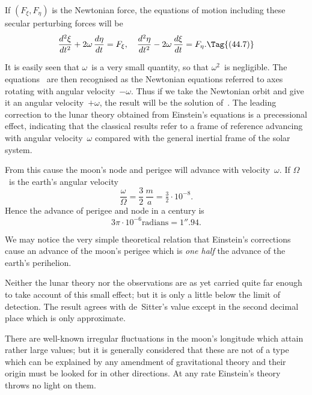 \documentclass[12pt]{book}
\begin{document}
If $(F_{\xi}, F_{\eta})$ is the Newtonian force, the equations of motion including these
secular perturbing forces will be
\[
\frac{d^{2}\xi}{dt^{2}} + 2\omega\, \frac{d\eta}{dt} = F_{\xi},\quad
\frac{d^{2}\eta}{dt^{2}} - 2\omega\, \frac{d\xi}{dt} = F_{\eta}.
\Tag{(44.7)}
\]

It is easily seen that $\omega$~is a very small quantity, so that $\omega^{2}$~is negligible.
The equations~ are then recognised as the Newtonian equations referred
to axes rotating with angular velocity~$-\omega$. Thus if we take the Newtonian
orbit and give it an angular velocity~$+\omega$, the result will be the solution of~.
The leading correction to the lunar theory obtained from Einstein's
equations is a precessional effect, indicating that the classical results refer to
a frame of reference advancing with angular velocity~$\omega$ compared with the
general inertial frame of the solar system.

From this cause the moon's node and perigee will advance with velocity~$\omega$.
If $\Omega$~is the earth's angular velocity
\[
\frac{\omega}{\Omega} = \frac{3}{2}\, \frac{m}{a} = \tfrac{3}{2} \cdot 10^{-8}.
\]
Hence the advance of perigee and node in a century is
\[
3\pi \cdot 10^{-6} \text{radians} = 1''.94.
\]

We may notice the very simple theoretical relation that Einstein's corrections
cause an advance of the moon's perigee which is \emph{one half} the advance
of the earth's perihelion.

Neither the lunar theory nor the observations are as yet carried quite far
enough to take account of this small effect; but it is only a little below the
limit of detection. The result agrees with de~Sitter's value except in the second
decimal place which is only approximate.

There are well-known irregular fluctuations in the moon's longitude which
attain rather large values; but it is generally considered that these are not
of a type which can be explained by any amendment of gravitational theory
and their origin must be looked for in other directions. At any rate Einstein's
theory throws no light on them.
\end{document}

